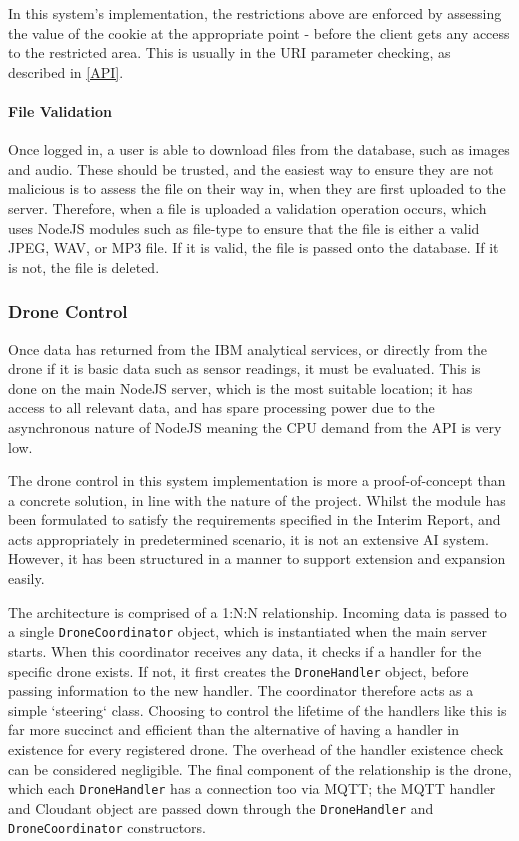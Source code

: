 \documentclass{article}
\begin{document}
In this system's implementation, the restrictions above are enforced by assessing the value of the cookie at the appropriate point - before the client gets any access to the restricted area. This is usually in the URI parameter checking, as described in \ref{API}. 

\paragraph{File Validation}
Once logged in, a user is able to download files from the database, such as images and audio. These should be trusted, and the easiest way to ensure they are not malicious is to assess the file on their way in, when they are first uploaded to the server. Therefore, when a file is uploaded a validation operation occurs, which uses NodeJS modules such as file-type \cite{file-type} to ensure that the file is either a valid JPEG, WAV, or MP3 file. If it is valid, the file is passed onto the database. If it is not, the file is deleted. 


\subsubsection{Drone Control} \label{DroneControl}
Once data has returned from the IBM analytical services, or directly from the drone if it is basic data such as sensor readings, it must be evaluated. This is done on the main NodeJS server, which is the most suitable location; it has access to all relevant data, and has spare processing power due to the asynchronous nature of NodeJS meaning the CPU demand from the API is very low. 

The drone control in this system implementation is more a proof-of-concept than a concrete solution, in line with the nature of the project. Whilst the module has been formulated to satisfy the requirements specified in the Interim Report, and acts appropriately in predetermined scenario, it is not an extensive AI system. However, it has been structured in a manner to support extension and expansion easily. 

The architecture is comprised of a 1:N:N relationship. Incoming data is passed to a single \texttt{DroneCoordinator} object, which is instantiated when the main server starts. When this coordinator receives any data, it checks if a handler for the specific drone exists. If not, it first creates the \texttt{DroneHandler} object, before passing information to the new handler. The coordinator therefore acts as a simple `steering` class. Choosing to control the lifetime of the handlers like this is far more succinct and efficient than the alternative of having a handler in existence for every registered drone. The overhead of the handler existence check can be considered negligible. The final component of the relationship is the drone, which each \texttt{DroneHandler} has a connection too via MQTT; the MQTT handler and Cloudant object are passed down through the \texttt{DroneHandler} and \texttt{DroneCoordinator} constructors. 
\end{document}
